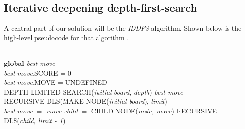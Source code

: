 \documentclass[a4paper,11pt]{article}
\begin{document}
\subsection{Iterative deepening depth-first-search}
A central part of our solution will be the \emph{IDDFS} algorithm.
Shown below is the
high-level pseudocode for that algorithm \cite{aimodern}.\\
\begin{algorithmic}
 \\
\textbf{global} \emph{best-move} \\
\emph{best-move}.SCORE = 0 \\
\emph{best-move}.MOVE = UNDEFINED \\
\State DEPTH-LIMITED-SEARCH(\emph{initial-board, depth})
\State \Return \emph{best-move}
\EndIf
\EndFor
\EndFunction
\\
\State \Return RECURSIVE-DLS(MAKE-NODE(\emph{initial-board}), \emph{limit})
\EndFunction
\\
\State \emph{best-move} $=$ \emph{move}
\EndIf
\State \emph{child} $=$ CHILD-NODE(\emph{node, move})
\State RECURSIVE-DLS(\emph{child, limit - 1})
\EndFor
\EndIf
\EndFunction
\end{algorithmic}






\end{document}
